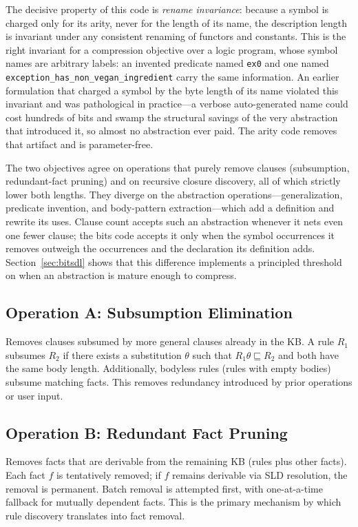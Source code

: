 \documentclass[10pt,conference]{IEEEtran}
\begin{document}
The decisive property of this code is \emph{rename invariance}: because a symbol is charged only for its arity, never for the length of its name, the description length is invariant under any consistent renaming of functors and constants. This is the right invariant for a compression objective over a logic program, whose symbol names are arbitrary labels: an invented predicate named \texttt{ex0} and one named \texttt{exception\_has\_non\_vegan\_ingredient} carry the same information. An earlier formulation that charged a symbol by the byte length of its name violated this invariant and was pathological in practice---a verbose auto-generated name could cost hundreds of bits and swamp the structural savings of the very abstraction that introduced it, so almost no abstraction ever paid. The arity code removes that artifact and is parameter-free.

The two objectives agree on operations that purely remove clauses (subsumption, redundant-fact pruning) and on recursive closure discovery, all of which strictly lower both lengths. They diverge on the abstraction operations---generalization, predicate invention, and body-pattern extraction---which add a definition and rewrite its uses. Clause count accepts such an abstraction whenever it nets even one fewer clause; the bits code accepts it only when the symbol occurrences it removes outweigh the occurrences and the declaration its definition adds. Section~\ref{sec:bitsdl} shows that this difference implements a principled threshold on when an abstraction is mature enough to compress.

\subsection{Operation A: Subsumption Elimination}
\label{sec:opA}

Removes clauses subsumed by more general clauses already in the KB. A rule $R_1$ subsumes $R_2$ if there exists a substitution $\theta$ such that $R_1\theta \sqsubseteq R_2$ and both have the same body length. Additionally, bodyless rules (rules with empty bodies) subsume matching facts. This removes redundancy introduced by prior operations or user input.

\subsection{Operation B: Redundant Fact Pruning}

Removes facts that are derivable from the remaining KB (rules plus other facts). Each fact $f$ is tentatively removed; if $f$ remains derivable via SLD resolution, the removal is permanent. Batch removal is attempted first, with one-at-a-time fallback for mutually dependent facts. This is the primary mechanism by which rule discovery translates into fact removal.
\end{document}
